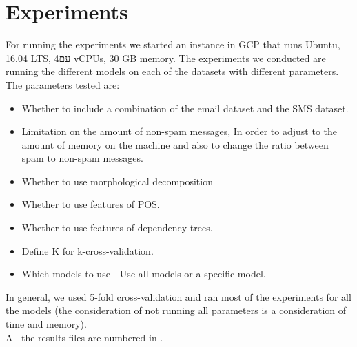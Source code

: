 \documentclass[11pt,a4paper]{article}
\begin{document}
\section{Experiments}
For running the experiments we started an instance in GCP that runs Ubuntu, 16.04 LTS,  עם4 vCPUs, 30 GB memory. The experiments we conducted are running the different models on each of the datasets with different parameters.\\
The parameters tested are:
\begin{itemize}
\item Whether to include a combination of the email dataset and the SMS dataset.
\item Limitation on the amount of non-spam messages, In order to adjust to the amount of memory on the machine and also to change the ratio between spam to non-spam messages.
\item Whether to use morphological decomposition
\item Whether to use features of POS.
\item Whether to use features of dependency trees.
\item Define K for k-cross-validation.
\item Which models to use - Use all models or a specific model.
\end{itemize}
\noindent In general, we used 5-fold cross-validation and ran most of the experiments for all the models (the consideration of not running all parameters is a consideration of time and memory).\\
All the results files are numbered in \citep{git}.\\
\end{document}
